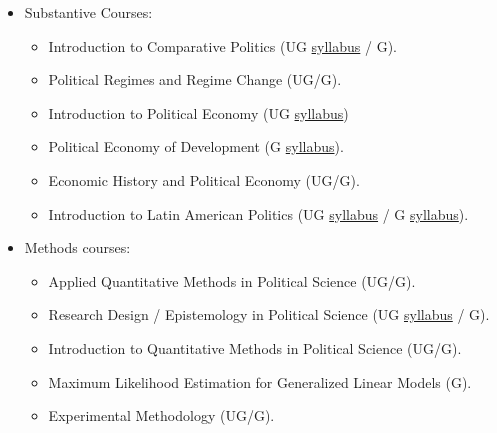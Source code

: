 \documentclass[10pt,stdletter,dateno,sigleft]{newlfm} %
\begin{document}
\begin{newlfm}




{\unskip}



\begin{itemize}
\item Substantive Courses:
	\begin{itemize}
	\item Introduction to Comparative Politics (UG \href{https://github.com/hbahamonde/Comparative_Politics_UGRAD/raw/master/Bahamonde_Comparative_Politics_Syllabus_UGRAD.pdf}{syllabus} / G).
	\item Political Regimes and Regime Change (UG/G).
	\item Introduction to Political Economy (UG \href{https://github.com/hbahamonde/Political-Economy-Intro-UGrad/raw/master/Pol_Econ_Dev_Syllabus_UGRAD.pdf}{syllabus})
	\item Political Economy of Development (G \href{https://github.com/hbahamonde/Pol_Econ_Dev_Grad/raw/master/Pol_Econ_Dev_Syllabus_GRAD.pdf}{syllabus}).
	\item Economic History and Political Economy (UG/G).
	\item Introduction to Latin American Politics (UG \href{https://github.com/hbahamonde/Latin_American_Politics_UGRAD/raw/master/Bahamonde_Latin_American_Politics_Syllabus_UGRAD.pdf}{syllabus} / G \href{https://github.com/hbahamonde/Latin_American_Politics_GRAD/raw/master/Bahamonde_Latin_American_Politics_Syllabus_GRAD.pdf}{syllabus}).
	\end{itemize}
\item Methods courses:
	\begin{itemize}
	\item Applied Quantitative Methods in Political Science (UG/G).
	\item Research Design / Epistemology in Political Science (UG \href{https://github.com/hbahamonde/Social_Sciences_Epistemology_UGRAD/raw/master/Bahamonde_Social_Sciences_Epistemology_UGRAD_Syllabus.pdf}{syllabus} / G).
	\item Introduction to Quantitative Methods in Political Science (UG/G).
	\item Maximum Likelihood Estimation for Generalized Linear Models (G).
	\item Experimental Methodology (UG/G).
	\end{itemize}
\end{itemize}



\end{newlfm}
\end{document}
